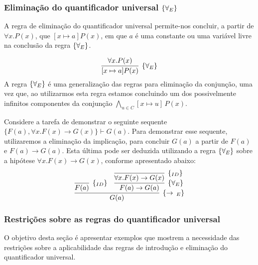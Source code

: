 \subsubsection{Eliminação do quantificador universal $\scriptsize{\{\forall_E}\}$}

A regra de eliminação do quantificador universal permite-nos concluir,
a partir de $\forall x. P(x)$, que $[x\mapsto a]P(x)$, em que $a$ é uma
constante ou uma variável livre na conclusão da regra $\scriptsize{\{\forall_E}\}$.

\[
\infer[\forallE]{[x\mapsto a]P(x)}
                      {\forall x. P(x)}
\]
A regra $\scriptsize{\{\forall_E}\}$ é uma generalização das regras para eliminação da
conjunção, uma vez que, ao utilizarmos esta regra estamos concluindo
um dos possivelmente infinitos componentes da conjunção
$\bigwedge_{u\in C}[x\mapsto u]\,P(x)$.
\begin{Example}
Considere a tarefa de demonstrar o seguinte sequente $\{F(a),\forall
x. F(x) \to G(x)\} \vdash G(a)$. Para demonstrar esse sequente,
utilizaremos a eliminação da implicação, para concluir $G(a)$ a partir
de $F(a)$ e $F(a) \to G(a)$. Esta última pode ser deduzida utilizando
a regra $\scriptsize{\{\forall_E}\}$ sobre a hipótese $\forall x. F(x) \to G(x)$,
conforme apresentado abaixo:
\[
\infer[\impE]{G(a)}
        {\infer[\Id]{F(a)}{} &
         \infer[\forallE]{F(a) \to G(a)} {
           \infer[\Id]{\forall x. F(x)\to G(x)}{}
                  }}
\]
\end{Example}

\subsubsection{Restrições sobre as regras do quantificador universal}

O objetivo desta seção é apresentar exemplos que mostrem a necessidade
das restrições sobre a aplicabilidade das regras de introdução e
eliminação do quantificador universal.

